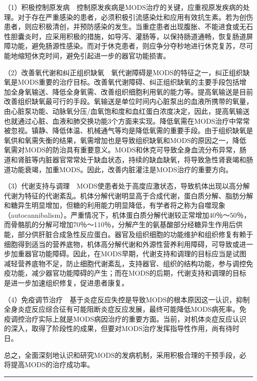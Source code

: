 （1）积极控制原发病　控制原发疾病是MODS治疗的关键，应重视原发疾病的处理。对于存在严重感染的患者，必须积极引流感染灶和应用有效抗生素。若为创伤患者，则应积极清创，并预防感染的发生。当重症患者出现腹胀、不能进食或无石性胆囊炎时，应采用积极的措施，如导泻、灌肠等，以保持肠道通畅，恢复肠道屏障功能，避免肠源性感染。而对于休克患者，则应争分夺秒地进行休克复苏，尽可能地缩短休克时间，避免引起进一步的器官功能损害。

（2）改善氧代谢和纠正组织缺氧　氧代谢障碍是MODS的特征之一，纠正组织缺氧是MODS重要的治疗目标。改善氧代谢障碍、纠正组织缺氧的主要手段包括增加全身氧输送、降低全身氧需、改善组织细胞利用氧的能力等。提高氧输送是目前改善组织缺氧最可行的手段。氧输送是单位时间内心脏泵出的血液所携带的氧量，由心脏泵功能、动脉氧分压/血氧饱和度和血红蛋白浓度决定，因此，提高氧输送也就通过心脏、血液和肺交换功能3个方面来实现。降低氧需在MODS治疗中常常被忽视。镇静、降低体温、机械通气等均是降低氧需的重要手段。由于组织缺氧是氧供和氧需失衡的结果，氧需增加也是导致组织缺氧和MODS的原因之一，降低氧需对MODS的防治具有重要意义。MODS和休克可导致全身血流分布异常，肠道和肾脏等内脏器官常常处于缺血状态，持续的缺血缺氧，将导致急性肾衰竭和肠道功能衰竭，加重MODS。因此，改善内脏灌注是MODS治疗的重要方向。

（3）代谢支持与调理　MODS使患者处于高度应激状态，导致机体出现以高分解代谢为特征的代谢紊乱。机体分解代谢明显高于合成代谢，蛋白质分解、脂肪分解和糖异生明显增加，但糖的利用能力明显降低，有学者将之称为自噬现象（autocannibalism）。严重情况下，机体蛋白质分解代谢较正常增加40％～50％，而骨骼肌的分解可增加70％～110％，分解产生的氨基酸部分经糖异生作用后供能，部分供肝脏合成急性反应蛋白。器官及组织细胞的功能维护和组织修复有赖于细胞得到适当的营养底物，机体高分解代谢和外源性营养利用障碍，可导致或进一步加重器官功能障碍。因此，在MODS早期，代谢支持和调理的目标应当是试图减轻营养底物不足，防止细胞代谢紊乱，支持器官、组织的结构功能，参与调控免疫功能，减少器官功能障碍的产生；而在MODS的后期，代谢支持和调理的目标是进一步加速组织修复，促进患者康复。

（4）免疫调节治疗　基于炎症反应失控是导致MODS的根本原因这一认识，抑制全身炎症反应综合征有可能阻断炎症反应发展，最终可能降低MODS病死率。免疫调控治疗实际上就是MODS病因治疗的重要方面。当前，对机体炎症反应认识的深入，取得了阶段性的成果，但要对MODS治疗发挥指导性作用，尚有待时日。

总之，全面深刻地认识和研究MODS的发病机制，采用积极合理的干预手段，必将提高MODS的治疗成功率。

\begin{center}\rule{0.5\linewidth}{\linethickness}\end{center}

